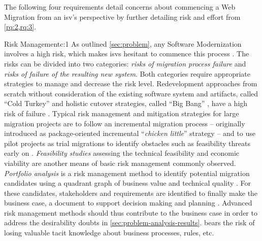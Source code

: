 The following four requirements detail concerns about commencing a \gls{Web Migration} from an \gls{isv}'s perspective by further detailing risk and effort from \cref{rq:2,rq:3}.


\begin{thesisstakeholderrequirement}{Risk Management}{c:1}
As outlined \cref{sec:problem}, any \gls{Software Modernization} involves a high risk, which makes \glspl{isv} hesitant to commence this process \autocite{Khadka2014ProfessionalsModernization,Canfora2000Decomposing,Bisbal1999LegacyInformationSystems,Heil2018ReWaMP}.
The risks can be divided into two categories: \emph{risks of migration process failure} and \emph{risks of failure of the resulting new system}.
Both categories require appropriate strategies to manage and decrease the risk level.
Redevelopment approaches from scratch without consideration of the existing software system and \glspl{artifact}, called ``Cold Turkey'' \autocite{Brodie1995Migrating} and holistic cutover strategies, called ``Big Bang'' \autocite{Bisbal1999LegacyInformationSystems}, have a high risk of failure \autocite{Sneed2010SoftwareMigration,Bisbal1999LegacyInformationSystems}.
Typical \gls{risk management} \autocite{ISO/IEEE24765Vocabulary} and mitigation strategies for large migration projects are to follow an incremental migration process \autocite{Colosimo2007ControlledExperiments,Sneed2010SoftwareMigration} -- originally introduced as package-oriented incremental ``\emph{chicken little}'' strategy \autocite{Brodie1995Migrating} -- and to use pilot projects as trial migrations to identify obstacles such as feasibility threats early on \autocite{AmazonWebServices2018Migration,Sneed2010SoftwareMigration}.
\emph{Feasibility studies} assessing the technical feasibility and economic viability \autocite{ISO/IEEE24765Vocabulary} are another means of basic \gls{risk management} commonly observed.
\emph{Portfolio analysis} is a \gls{risk management} method to identify potential migration candidates using a quadrant graph of business value and technical quality \autocite{Seacord2003ModernizingLS,Sneed1995CostBenefit}.
For these candidates, stakeholders and requirements are identified to finally make the \gls{business case}, a document to support decision making and planning \autocite{AmazonWebServices2018Migration,Seacord2003ModernizingLS}.
Advanced \gls{risk management} methods should thus contribute to the \gls{business case} \autocite{Seacord2003ModernizingLS} in order to address the desirability doubts in \cref{sec:problem-analysis-results}.
 bears the risk of losing valuable tacit knowledge about business processes, rules, etc.

\end{thesisstakeholderrequirement}
